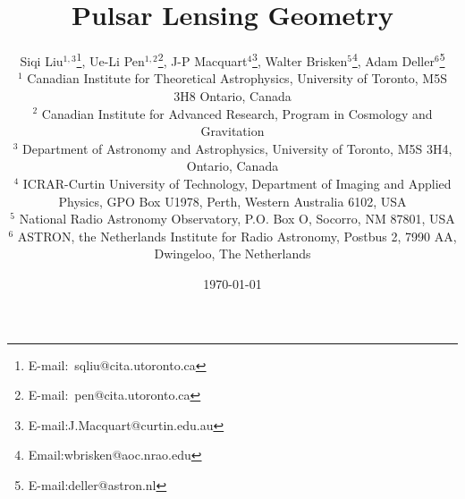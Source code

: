 \documentclass[useAMS,usenatbib]{mn2e}
\begin{document}
\title[Lensing Geometry]{
Pulsar Lensing Geometry
}

\author[Liu et al]{Siqi Liu$^{1,3}$\thanks{E-mail:\ sqliu@cita.utoronto.ca}, Ue-Li
  Pen$^{1,2}$\thanks{E-mail:\ pen@cita.utoronto.ca}, J-P Macquart$^{4}$\thanks{E-mail:J.Macquart@curtin.edu.au},
  Walter Brisken$^{5}$\thanks{Email:wbrisken@aoc.nrao.edu}, Adam Deller$^{6}$\thanks{E-mail:deller@astron.nl}\\
 $^1$ Canadian Institute for Theoretical Astrophysics, University of Toronto, M5S 3H8 Ontario, Canada \\
$^2$ Canadian Institute for Advanced Research, Program in Cosmology
and Gravitation\\
$^3$ Department of Astronomy and Astrophysics, University of Toronto, M5S 3H4, Ontario, Canada\\
$^4$ ICRAR-Curtin University of Technology, Department of Imaging and Applied Physics, GPO Box U1978, Perth, Western Australia 6102, USA \\
$^5$ National Radio Astronomy Observatory, P.O. Box O, Socorro, NM 87801, USA\\
$^6$ ASTRON, the Netherlands Institute for Radio Astronomy, Postbus 2, 7990 AA, Dwingeloo, The Netherlands\\
}

\date{\today}

\pagerange{\pageref{firstpage}--\pageref{lastpage}} 
\end{document}
